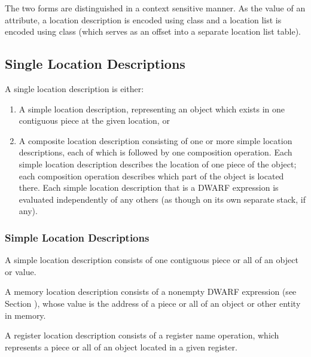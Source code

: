 The two forms are distinguished in a context sensitive
manner. As the value of an attribute, a location description
is encoded using 
class   
and a location list is encoded
using class 
(which 
serves as an offset into a
separate 
location list table).


\subsection{Single Location Descriptions}
A single location description is either:
\begin{enumerate}[1. ]
\item A simple location description, representing an object
which 
exists in one contiguous piece at the given location, or 
\item A composite location description consisting of one or more
simple location descriptions, each of which is followed by
one composition operation. Each simple location description
describes the location of one piece of the object; each
composition operation describes which part of the object is
located there. Each simple location description that is a
DWARF expression is evaluated independently of any others
(as though on its own separate stack, if any). 
\end{enumerate}



\subsubsection{Simple Location Descriptions}

A 
simple location description consists of one 
contiguous piece or all of an object or value.


A 
memory location description 
consists of a non\dash empty DWARF
expression (see 
Section 
), whose value is the address of
a piece or all of an object or other entity in memory.

A register location description consists of a register name
operation, which represents a piece or all of an object
located in a given register.

